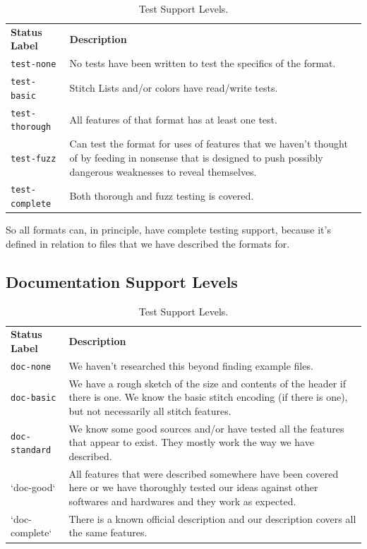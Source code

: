 \documentclass[10pt]{report}
\begin{document}
\begin{longtable}{p{4cm} p{8cm}}
\caption{Test Support Levels.}
\label{tab:test-support} \\
\textbf{Status Label} &
\textbf{Description} \\

\texttt{test-none} &
No tests have been written to test the specifics of the format. \\

\texttt{test-basic} &
Stitch Lists and/or colors have read/write tests. \\

\texttt{test-thorough} &
All features of that format has at least one test. \\

\texttt{test-fuzz} &
Can test the format for uses of features that we haven't thought of by feeding
in nonsense that is designed to push possibly dangerous weaknesses to reveal
themselves. \\

\texttt{test-complete} &
Both thorough and fuzz testing is covered.
\end{longtable}

So all formats can, in principle, have complete testing support, because it's
defined in relation to files that we have described the formats for.

\subsection{Documentation Support Levels}

\begin{longtable}{p{4cm} p{8cm}}
\caption{Test Support Levels.}
\label{tab:doc-support} \\
\textbf{Status Label} &
\textbf{Description} \\

\texttt{doc-none} &
We haven't researched this beyond finding example files. \\

\texttt{doc-basic} &
We have a rough sketch of the size and contents of the header if there is one.
We know the basic stitch encoding (if there is one), but not necessarily all
stitch features. \\

\texttt{doc-standard} &
We know some good sources and/or have tested all the features that appear to
exist. They mostly work the way we have described. \\

`doc-good` &
All features that were described somewhere have been covered here or we have
thoroughly tested our ideas against other softwares and hardwares and they work
as expected. \\

`doc-complete` &
There is a known official description and our description covers all the same
features.
\end{longtable}
\end{document}
